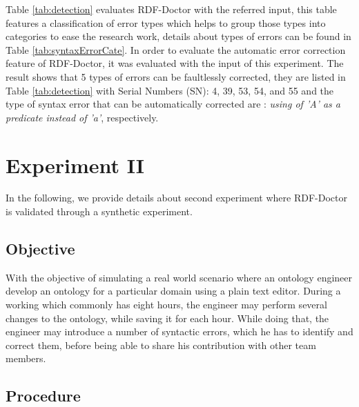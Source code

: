  Table \ref{tab:detection} evaluates RDF-Doctor with the referred input, this table features a classification of error types which helps to group those types into categories to ease the research work, details about types of errors can be found in Table \ref{tab:syntaxErrorCate}. In order to evaluate the automatic error correction feature of RDF-Doctor, it was evaluated with the input of this experiment. The result shows that 5 types of errors can be faultlessly corrected, they are listed in Table \ref{tab:detection} with Serial Numbers (SN): 4, 39, 53, 54, and 55 and the type of syntax error that can be automatically corrected are : \emph{using of 'A' as a predicate instead of 'a'}, respectively.       

\section{Experiment II}

In the following, we provide details about second experiment where RDF-Doctor is validated through a synthetic experiment. 

\subsection{Objective}
With the objective of simulating a real world scenario where an ontology engineer develop an ontology for a particular domain using a plain text editor.
During a working which commonly has eight hours, the engineer may perform several changes to the ontology, while saving it for each hour.
While doing that, the engineer may introduce a number of syntactic errors, which he has to identify and correct them, before being able to share his contribution with other team members.


\subsection{Procedure}


